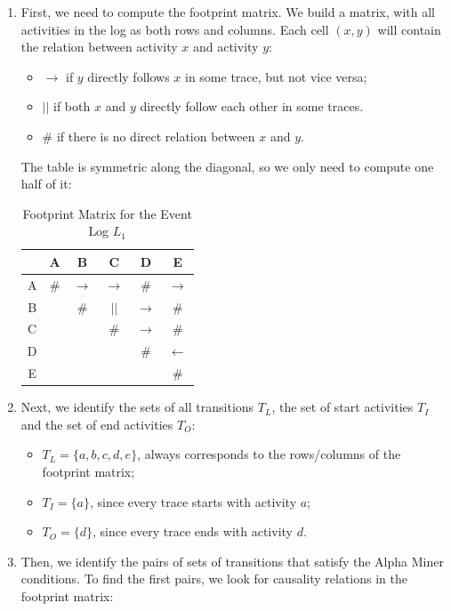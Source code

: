 \begin{enumerate}
    \item First, we need to compute the footprint matrix.
    We build a matrix, with all activities in the log as both rows and columns.
    Each cell \((x,y)\) will contain the relation between activity \(x\) and activity \(y\):
    \begin{itemize}
        \item \(\rightarrow\) if \(y\) directly follows \(x\) in some trace, but not vice versa;
        \item \(||\) if both \(x\) and \(y\) directly follow each other in some traces.
        \item \(\#\) if there is no direct relation between \(x\) and \(y\).
    \end{itemize}
    The table is symmetric along the diagonal, so we only need to compute one half of it:
    \begin{table}[H]
    \centering
    \begin{tabular}{c|ccccc}
        & A & B & C & D & E \\
        \hline
        A & $\#$ & $\rightarrow$ & $\rightarrow$ & $\#$ & $\rightarrow$ \\
        B &  & $\#$ & $||$ & $\rightarrow$ & $\#$ \\
        C &  &  & $\#$ & $\rightarrow$ & $\#$ \\
        D &  &  &  & $\#$ & $\leftarrow$ \\
        E &  &  &  &  & $\#$ \\
    \end{tabular}
    \caption{Footprint Matrix for the Event Log \(L_1\)}
\end{table}
    \item Next, we identify the sets of all transitions $T_L$, the set of start activities $T_I$ and the set of end activities $T_O$:
    \begin{itemize}
        \item $T_L = \{a,b,c,d,e\}$, always corresponds to the rows/columns of the footprint matrix;
        \item $T_I = \{a\}$, since every trace starts with activity \(a\);
        \item $T_O = \{d\}$, since every trace ends with activity \(d\).
    \end{itemize}
    \item Then, we identify the pairs of sets of transitions that satisfy the Alpha Miner conditions.
    To find the first pairs, we look for causality relations in the footprint matrix:

\end{enumerate}
